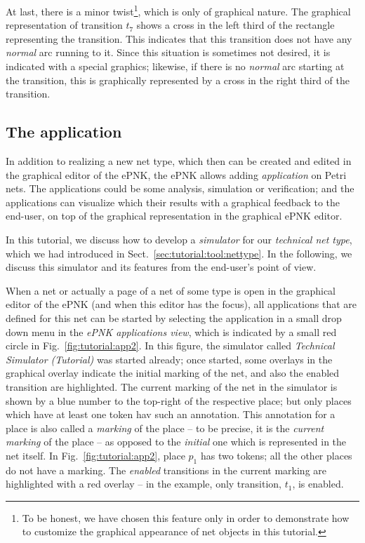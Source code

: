 At last, there is a minor twist\footnote
  {To be honest, we have chosen this feature only in order to demonstrate how
   to customize the graphical appearance of net objects in this tutorial.},
which is only of graphical nature. The
graphical representation of transition $t_7$ shows a cross in the left third of the
rectangle representing the transition. This indicates that this
transition does not have any \emph{normal} arc running to it. Since this
situation is sometimes not desired, it is indicated with a
special graphics; likewise, if there is no \emph{normal} arc starting at
the transition, this is graphically represented by a cross in the right
third of the transition. 

\subsection{The application}
\label{sec:tutorial:tool:application}

In addition to realizing a new net type, which then can be created and edited
in the graphical editor of the ePNK, the ePNK allows adding
\emph{application} on Petri nets. The applications could be some
analysis, simulation or verification; and the applications can visualize which
their results with a graphical feedback to the end-user, on top of the graphical
representation in the graphical ePNK editor.

In this tutorial, we discuss how to develop a \emph{simulator} for our
\emph{technical net type}, which we had introduced in
Sect.~\ref{sec:tutorial:tool:nettype}. In the following, we discuss this
simulator and its features from the end-user's point of view.

When a net or actually a page of a net of some type is open in the graphical
editor of the ePNK (and when this editor has the focus), all applications that
are defined for this net can be started by selecting the application in a small
drop down menu in the \emph{ePNK applications view}, which is indicated by
a small red circle in Fig.~\ref{fig:tutorial:app2}. In this figure, the
simulator called \emph{Technical Simulator (Tutorial)} was started already;
once started, some overlays in the graphical overlay indicate the initial
marking of the net, and also the enabled transition are highlighted. The
current marking of the net in the simulator is shown by a blue number to
the top-right of the respective place; but only places which have at least
one token hav such an annotation. This annotation for a place is also called
a \emph{marking} of the place -- to be precise, it is the \emph{current
marking} of the place -- as opposed to the \emph{initial} one which is
represented in the net itself. In Fig.~\ref{fig:tutorial:app2}, place $p_1$ has
two tokens; all the other places do not have a marking. The \emph{enabled}
transitions in the current marking are highlighted with a red overlay --
in the example, only transition, $t_1$, is enabled.

